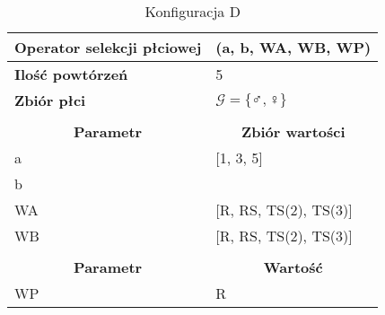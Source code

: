 \documentclass[twoside]{iisthesis}
\newcommand{\important}[1]{\mathcal{#1}}
\newcommand{\opName}[1]{\textproc{#1}}
\begin{document}
\begin{table}[h]
	\caption{Konfiguracja D \label{table:knapsack_config_compare_d}}
	\begin{tabularx}{\linewidth}{lX}
		\hline
		\multicolumn{1}{|l|}{{\bf Operator selekcji płciowej}}        & \multicolumn{1}{l|}{\opName{harem}(a, b, WA, WB, WP)} \\ \hline
		\multicolumn{1}{|l|}{{\bf Ilość powtórzeń}} & \multicolumn{1}{l|}{5}                                  \\ \hline
		\multicolumn{1}{|l|}{{\bf Zbiór płci}} & \multicolumn{1}{l|}{$\important{G} = \{ \male, \female \}$} \\ \hline
		&                                                         \\ \hline
		\multicolumn{1}{|c|}{{\bf Parametr}}        & \multicolumn{1}{c|}{{\bf Zbiór wartości}}               \\ \hline \hline
		\multicolumn{1}{|l|}{a}                     & \multicolumn{1}{l|}{{[}1, 3, 5{]}}                      \\ \hline
		\multicolumn{1}{|l|}{b}                     & \multicolumn{1}{l|}{}                                   \\ \hline
		\multicolumn{1}{|l|}{WA}                    & \multicolumn{1}{l|}{[R, RS, TS(2), TS(3)]}          \\ \hline
		\multicolumn{1}{|l|}{WB}                    & \multicolumn{1}{l|}{[R, RS, TS(2), TS(3)]}          \\ \hline
		&                                                         \\ \hline
		\multicolumn{1}{|c|}{{\bf Parametr}}        & \multicolumn{1}{c|}{{\bf Wartość}}                      \\ \hline \hline
		\multicolumn{1}{|l|}{WP}                    & \multicolumn{1}{l|}{R}                                  \\ \hline
	\end{tabularx}
\end{table}
\end{document}
